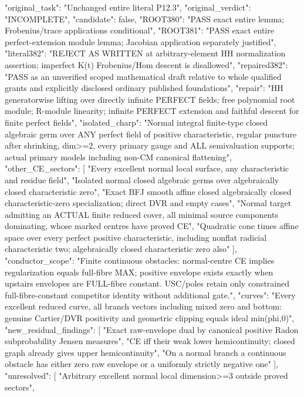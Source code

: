 \documentclass[11pt]{article}
\begin{document}
\begin{ImportedQualifiedGrant}
{
  "original_task": "Unchanged entire literal P12.3",
  "original_verdict": "INCOMPLETE",
  "candidate": false,
  "ROOT380": "PASS exact entire lemma; Frobenius/trace applications conditional",
  "ROOT381": "PASS exact entire perfect-extension module lemma; Jacobian application separately justified",
  "literal382": "REJECT AS WRITTEN at arbitrary-element HH normalization assertion; imperfect K(t) Frobenius/Hom descent is disallowed",
  "repaired382": "PASS as an unverified scoped mathematical draft relative to whole qualified grants and explicitly disclosed ordinary published foundations",
  "repair": "HH generatorwise lifting over directly infinite PERFECT fields; free polynomial root module; R-module linearity; infinite PERFECT extension and faithful descent for finite perfect fields",
  "isolated_charp": "Normal integral finite-type closed algebraic germ over ANY perfect field of positive characteristic, regular puncture after shrinking, dim>=2, every primary gauge and ALL semivaluation supports; actual primary models including non-CM canonical flattening",
  "other_CE_sectors": [
    "Every excellent normal local surface, any characteristic and residue field",
    "Isolated normal closed algebraic germs over algebraically closed characteristic zero",
    "Exact BFJ smooth affine closed algebraically closed characteristic-zero specialization; direct DVR and empty cases",
    "Normal target admitting an ACTUAL finite reduced cover, all minimal source components dominating, whose marked centres have proved CE",
    "Quadratic cone times affine space over every perfect positive characteristic, including nonflat radicial characteristic two; algebraically closed characteristic zero also"
  ],
  "conductor_scope": "Finite continuous obstacles: normal-centre CE implies regularization equals full-fibre MAX; positive envelope exists exactly when upstairs envelopes are FULL-fibre constant. USC/poles retain only constrained full-fibre-constant competitor identity without additional gate.",
  "curves": "Every excellent reduced curve, all branch vectors including mixed zero and bottom: genuine Cartier/DVR positivity and geometric clipping equals ideal min(phi,0)",
  "new_residual_findings": [
    "Exact raw-envelope dual by canonical positive Radon subprobability Jensen measures",
    "CE iff their weak lower hemicontinuity; closed graph already gives upper hemicontinuity",
    "On a normal branch a continuous obstacle has either zero raw envelope or a uniformly strictly negative one"
  ],
  "unresolved": [
    "Arbitrary excellent normal local dimension>=3 outside proved sectors",
}
\end{ImportedQualifiedGrant}
\end{document}
